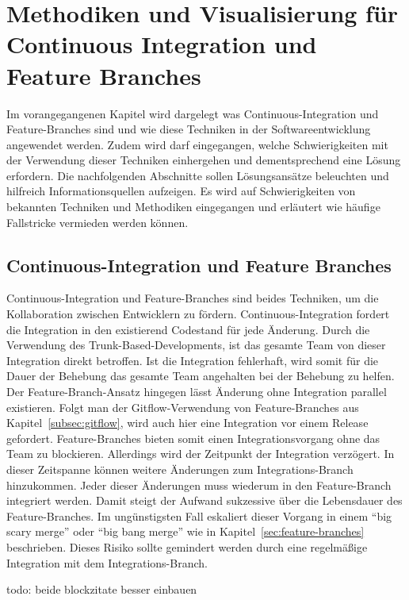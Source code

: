 \chapter{Methodiken und Visualisierung für Continuous Integration und Feature Branches}
\label{ch:visu_meth}

Im vorangegangenen Kapitel wird dargelegt was Continuous-Integration und Feature-Branches sind und wie diese Techniken in der Softwareentwicklung angewendet werden. Zudem wird darf eingegangen, welche Schwierigkeiten mit der Verwendung dieser Techniken einhergehen und dementsprechend eine Lösung erfordern. 
Die nachfolgenden Abschnitte sollen Lösungsansätze beleuchten und hilfreich Informationsquellen aufzeigen. Es wird auf Schwierigkeiten von bekannten Techniken und Methodiken eingegangen und erläutert wie häufige Fallstricke vermieden werden können.

\section{Continuous-Integration und Feature Branches}

Continuous-Integration und Feature-Branches sind beides Techniken, um die Kollaboration zwischen Entwicklern zu fördern. Continuous-Integration fordert die Integration in den existierend Codestand für jede Änderung. Durch die Verwendung des Trunk-Based-Developments, ist das gesamte Team von dieser Integration direkt betroffen. Ist die Integration fehlerhaft, wird somit für die Dauer der Behebung das gesamte Team angehalten bei der Behebung zu helfen. Der Feature-Branch-Ansatz hingegen lässt Änderung ohne Integration parallel existieren. Folgt man der Gitflow-Verwendung von Feature-Branches aus Kapitel~\ref{subsec:gitflow}, wird auch hier eine Integration vor einem Release gefordert. Feature-Branches bieten somit einen Integrationsvorgang ohne das Team zu blockieren. Allerdings wird der Zeitpunkt der Integration verzögert. In dieser Zeitspanne können weitere Änderungen zum Integrations-Branch hinzukommen. Jeder dieser Änderungen muss wiederum in den Feature-Branch integriert werden. Damit steigt der Aufwand sukzessive über die Lebensdauer des Feature-Branches. Im ungünstigsten Fall eskaliert dieser Vorgang in einem ``big scary merge'' oder ``big bang merge'' wie in Kapitel~\ref{sec:feature-branches} beschrieben. Dieses Risiko sollte gemindert werden durch eine regelmäßige Integration mit dem Integrations-Branch. 

todo: beide blockzitate besser einbauen\\

